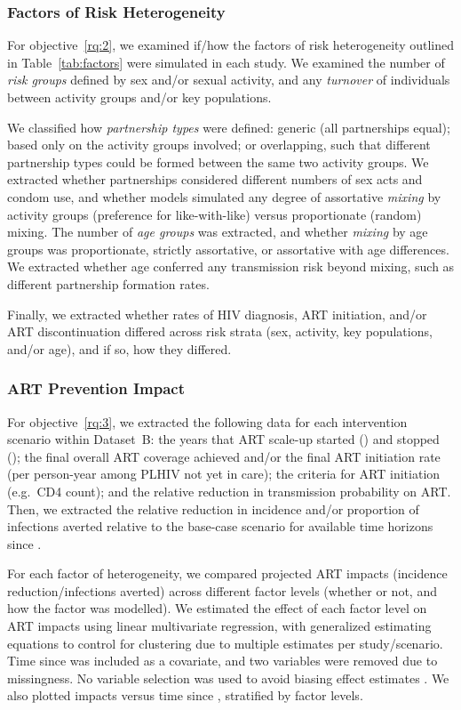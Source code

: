 \subsubsection{Factors of Risk Heterogeneity}
\label{sss:meth:factors}
For objective~\ref{rq:2}, we examined if/how
the factors of risk heterogeneity outlined in Table~\ref{tab:factors}
were simulated in each study.
We examined the number of \emph{risk groups} defined by sex and/or sexual activity, and
any \emph{turnover} of individuals between activity groups and/or key populations.
\par
We classified how \emph{partnership types} were defined:
generic (all partnerships equal);
based only on the activity groups involved;
or overlapping, such that different partnership types could be formed between the same two activity groups.
We extracted whether partnerships considered different
numbers of sex acts and condom use,
and whether models simulated any degree of assortative \emph{mixing} by activity groups
(preference for like-with-like) versus proportionate (random) mixing.
The number of \emph{age groups} was extracted, and whether \emph{mixing} by age groups was
proportionate, strictly assortative, or assortative with age differences.
We extracted whether age conferred any transmission risk beyond mixing,
such as different partnership formation rates.
\par
Finally, we extracted whether rates of HIV diagnosis, ART initiation, and/or ART discontinuation
differed across risk strata (sex, activity, key populations, and/or age),
and if so, how they differed.
\subsubsection{ART Prevention Impact}
\label{sss:meth:api}
For objective~\ref{rq:3}, we extracted
the following data for each intervention scenario within Dataset~B:
the years that ART scale-up started () and stopped ();
the final overall ART coverage achieved and/or
the final ART initiation rate (per person-year among PLHIV not yet in care);
the criteria for ART initiation (e.g.\ CD4 count); and
the relative reduction in transmission probability on ART.
Then, we extracted the
relative reduction in incidence and/or proportion of infections averted
relative to the base-case scenario for available time horizons since .
\par
For each factor of heterogeneity,
we compared projected ART impacts (incidence reduction/infections averted)
across different factor levels (whether or not, and how the factor was modelled).
We estimated the effect of each factor level on ART impacts
using linear multivariate regression, with generalized estimating equations \cite{Hojsgaard2006}
to control for clustering due to multiple estimates per study/scenario.
Time since  was included as a covariate, and two variables were removed due to missingness.
No variable selection was used to avoid biasing effect estimates \cite{Harrell2001}.
We also plotted impacts versus time since , stratified by factor levels.